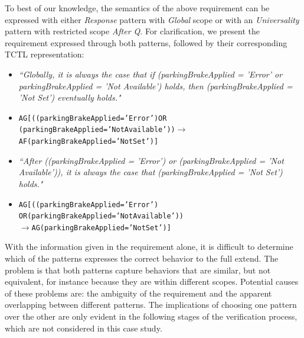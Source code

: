 \documentclass[conference]{IEEEtran}
\begin{document}
To best of our knowledge, the semantics of the above requirement can be expressed with either \textit{Response} pattern with \textit{Global} scope or with an \textit{Universality} pattern with restricted scope \textit{After Q}. For clarification, we present the requirement expressed through both patterns, followed by their corresponding TCTL representation:
\begin{itemize}
\item \textit{``Globally, it is always the case that if (parkingBrakeApplied = 'Error' or parkingBrakeApplied = 'Not Available') holds, then (parkingBrakeApplied = 'Not Set') eventually holds."}

\item[] \vspace{0.1cm}
{\small
\begin{alltt}
AG[((parkingBrakeApplied = 'Error') OR 
(parkingBrakeApplied = 'Not Available')) \(\rightarrow\)
AF(parkingBrakeApplied = 'Not Set')]

\end{alltt}
}
\item \textit{``After ((parkingBrakeApplied = 'Error') or (parkingBrakeApplied = 'Not Available')), it is always the case that (parkingBrakeApplied = 'Not Set') holds."}
\item[] \vspace{0.1cm}
{\small
\begin{alltt}
AG[((parkingBrakeApplied = 'Error')
OR (parkingBrakeApplied = 'Not Available'))
\(\rightarrow\) AG(parkingBrakeApplied = 'Not Set')]

\end{alltt}
}
\end{itemize}

With the information given in the requirement alone, it is difficult to determine which of the patterns expresses the correct behavior to the full extend. The problem is that both patterns capture behaviors that are similar, but not equivalent, for instance because they are within different scopes. Potential causes of these problems are: the ambiguity of the requirement and the apparent overlapping between different patterns. The implications of choosing one pattern over the other are only evident in the following stages of the verification process, which are not considered in this case study.
\end{document}
